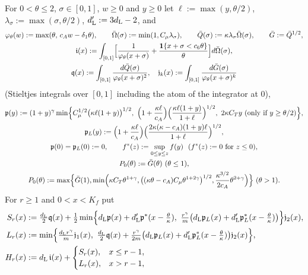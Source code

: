 \begin{definition}\label{def:Dprime}
For $0<\theta\le2$, $\sigma\in[0,1]$, $w\ge0$ and $y\ge0$ let $\ell:=\max(y,\theta/2)$, $\lambda_\sigma:=\max(\sigma,\theta/2)$,
$d_{\mathrm L}':=3d_{\mathrm L}-2$, and
\begin{gather*}
\varphi_\theta(w):=\max(\theta,\,c_Aw-\delta_1\theta),\qquad\bar\Omega(\sigma):=\min(1,C_\mu\lambda_\sigma),\qquad
\bar Q(\sigma):=\kappa\lambda_\sigma\bar\Omega(\sigma),\qquad\bar G:=\bar Q^{1/2},\\
\mathfrak i(x):=\int_{[0,1]}\Bigl[\frac1{\varphi_\theta(x+\sigma)}+\frac{\mathbf 1\{x+\sigma<c_6\theta\}}\theta\Bigr]d\bar\Omega(\sigma),\\
\mathfrak q(x):=\int_{[0,1]}\frac{d\bar Q(\sigma)}{\varphi_\theta(x+\sigma)^2},\quad
\mathfrak j_k(x):=\int_{[0,1]}\frac{d\bar G(\sigma)}{\varphi_\theta(x+\sigma)^k}
\end{gather*}
(Stieltjes integrals over $[0,1]$ including the atom of the integrator at $0$),
\begin{gather*}
\mathfrak p(y):=(1+y)^\gamma\min\Bigl\{\Cmu^{1/2}\bigl(\kappa\ell(1+y)\bigr)^{1/2},\ \Bigl(1+\frac{\kappa\ell}{c_A}\Bigr)
\Bigl(\frac{\kappa\ell(1+y)}{1+\ell}\Bigr)^{1/2},\ 2\kappa\CT y\ \text{(only if $y\ge\theta/2$)}\Bigr\},\\
\mathfrak p_L(y):=\Bigl(1+\frac{\kappa\ell}{c_A}\Bigr)\Bigl(\frac{2\kappa(\kappa-c_A)(1+y)\ell}{1+\ell}\Bigr)^{1/2},\\
\mathfrak p(0)=\mathfrak p_L(0):=0,\qquad f^*(z):=\sup_{0\le y\le z}f(y)\ \ (f^*(z):=0\text{ for }z\le0),\\
P_0(\theta):=\bar G(\theta)\ (\theta\le1),\\
P_0(\theta):=\max\Bigl\{\bar G(1),\min\Bigl(\kappa\CT\theta^{1+\gamma},
\bigl((\kappa\theta-c_A)\Cmu\theta^{1+2\gamma}\bigr)^{1/2},\frac{\kappa^{3/2}}{2c_A}\theta^{2+\gamma}\Bigr)\Bigr\}\ (\theta>1).
\end{gather*}
For $r\ge1$ and $0<x<K_f$ put
\begin{align*}
S_r(x)&:=\tfrac{\dL}2\mathfrak q(x)+\tfrac12\min\Bigl\{\dL\mathfrak p(x)+\dL'\mathfrak p^*(x-\tfrac\theta\kappa),\
\tfrac{r^\gamma}m\bigl(\dL\mathfrak p_L(x)+\dL'\mathfrak p_L^*(x-\tfrac\theta\kappa)\bigr)\Bigr\}\mathfrak j_2(x),\\
L_r(x)&:=\min\Bigl\{\tfrac{\dL r^\gamma}m\mathfrak j_1(x),\ \tfrac{\dL}2\mathfrak q(x)+\tfrac{r^\gamma}{2m}
\bigl(\dL\mathfrak p_L(x)+\dL'\mathfrak p_L^*(x-\tfrac\theta\kappa)\bigr)\mathfrak j_2(x)\Bigr\},\\
H_r(x)&:=\dL\,\mathfrak i(x)+\begin{cases}S_r(x),&x\le r-1,\\L_r(x),&x>r-1,\end{cases}\qquad

\end{align*}
\end{definition}
